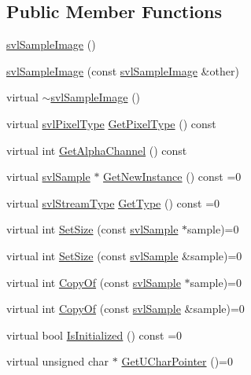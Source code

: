 \subsection*{Public Member Functions}
\begin{DoxyCompactItemize}
\item 
\hyperlink{classsvl_sample_image_a3ea8c6077b2fc3242525420ec735b8cd}{svl\+Sample\+Image} ()
\item 
\hyperlink{classsvl_sample_image_ad1e8932d931df496c76922257f9227d5}{svl\+Sample\+Image} (const \hyperlink{classsvl_sample_image}{svl\+Sample\+Image} \&other)
\item 
virtual \hyperlink{classsvl_sample_image_ab5335f489acd87face50a5bfa4cef0d9}{$\sim$svl\+Sample\+Image} ()
\item 
virtual \hyperlink{svl_definitions_8h_a8e3e868f4df8c6c3a6dba958c81b34b5}{svl\+Pixel\+Type} \hyperlink{classsvl_sample_image_ae43c1829be4c737f25e826ab9aa2dc5c}{Get\+Pixel\+Type} () const 
\item 
virtual int \hyperlink{classsvl_sample_image_ac32fdf4170720d33ffb5ee2bdf75ae5c}{Get\+Alpha\+Channel} () const 
\item 
virtual \hyperlink{classsvl_sample}{svl\+Sample} $\ast$ \hyperlink{classsvl_sample_image_a76fab1c3b1e2ecc2189c0d289d98e66a}{Get\+New\+Instance} () const =0
\item 
virtual \hyperlink{svl_definitions_8h_aa00696d338a58db361335a01fd11e122}{svl\+Stream\+Type} \hyperlink{classsvl_sample_image_a90f04a79c0906179bfecb77d07231a11}{Get\+Type} () const =0
\item 
virtual int \hyperlink{classsvl_sample_image_a47e887ac52468fadc6bc67431644c048}{Set\+Size} (const \hyperlink{classsvl_sample}{svl\+Sample} $\ast$sample)=0
\item 
virtual int \hyperlink{classsvl_sample_image_a29daafd2f51f8ff6ce0ce00080a20fa9}{Set\+Size} (const \hyperlink{classsvl_sample}{svl\+Sample} \&sample)=0
\item 
virtual int \hyperlink{classsvl_sample_image_a22a7170e17637426ff48d3abfdaadc82}{Copy\+Of} (const \hyperlink{classsvl_sample}{svl\+Sample} $\ast$sample)=0
\item 
virtual int \hyperlink{classsvl_sample_image_a4d24e3ee26d7a70f73fb88348a01c1eb}{Copy\+Of} (const \hyperlink{classsvl_sample}{svl\+Sample} \&sample)=0
\item 
virtual bool \hyperlink{classsvl_sample_image_a9a91b9605afdddb16a5b67290039c3a3}{Is\+Initialized} () const =0
\item 
virtual unsigned char $\ast$ \hyperlink{classsvl_sample_image_a40315b943675a7eabe94aced3b7b3e41}{Get\+U\+Char\+Pointer} ()=0

\end{DoxyCompactItemize}
